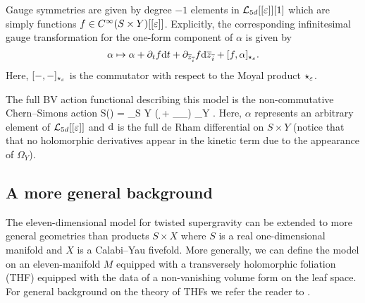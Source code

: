 Gauge symmetries are given by degree $-1$ elements in $\mathcal L_{5d}[[\varepsilon]][1]$ which are simply functions $f \in C^\infty (S\times Y)[[\varepsilon]]$. 
Explicitly, the corresponding infinitesimal gauge transformation for the one-form component of $\alpha$ is given by
\[
\alpha \mapsto \alpha + \partial_t f {\rm d} t +\partial_{\overline{z}_{\overline{i}}} f {\rm d} \overline{z}_{\overline{i}} + [f, \alpha]_{\star_\varepsilon} .
\]
Here, $[-,-]_{\star_{\varepsilon}}$ is the commutator with respect to the Moyal product $\star_\varepsilon$. 

The full BV action functional describing this model is the non-commutative Chern--Simons action
\beqn
S(\alpha) = \int_{S \times Y} \left( \alpha \d \alpha +  \alpha \star_\ep \alpha \star_\ep \alpha \right) \wedge \Omega_Y .
\eeqn
Here, $\alpha$ represents an arbitrary element of $\mathcal L_{5d}[[\varepsilon]]$ and ${\rm d}$ is the full de Rham differential on $S \times Y$ (notice that that no holomorphic derivatives appear in the kinetic term due to the appearance of $\Omega_Y$).


\subsection{A more general background}

The eleven-dimensional model for twisted supergravity can be extended to more general geometries than products $S \times X$ where $S$ is a real one-dimensional manifold and $X$ is a Calabi--Yau fivefold.
More generally, we can define the model on an eleven-manifold $M$ equipped with a transversely holomorphic foliation (THF) equipped with the data of a non-vanishing volume form on the leaf space.
For general background on the theory of THFs we refer the reader to \cite{DuchampKalka, KamberTondeur, Rawnsley}.

